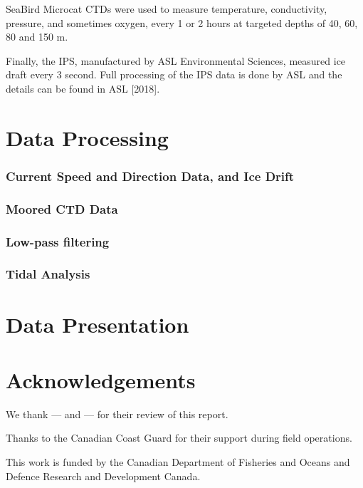\documentclass[12pt]{dforeport}
\begin{document}
SeaBird Microcat CTDs were used to measure temperature, conductivity, pressure, and sometimes oxygen, every 1 or 2 hours at targeted depths of 40, 60, 80 and 150 m. 

Finally, the IPS, manufactured by ASL Environmental Sciences, measured ice draft every 3 second. Full processing of the IPS data is done by ASL and the details can be found in ASL [2018].

\section{Data Processing}

\subsubsection{Current Speed and Direction Data, and Ice Drift}

\subsubsection{Moored CTD Data}

\subsubsection{Low-pass filtering}

\subsubsection{Tidal Analysis}

\section{Data Presentation}

\section{Acknowledgements}

We thank --- and --- for their review of this report.

\noindent
Thanks to the Canadian Coast Guard for their support during field operations.

\noindent
This work is funded by the Canadian Department of Fisheries and Oceans and Defence Research and Development Canada. 

\pagebreak



\end{document}
